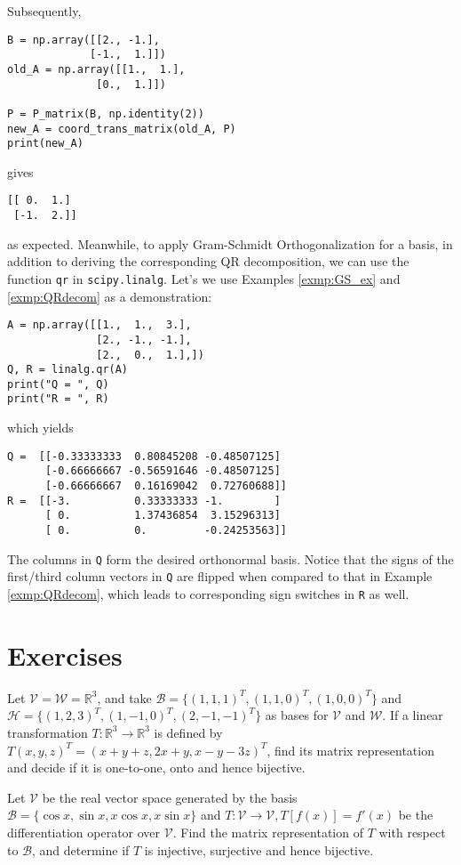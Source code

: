 Subsequently,
\begin{lstlisting}
B = np.array([[2., -1.], 
             [-1.,  1.]])
old_A = np.array([[1.,  1.], 
              [0.,  1.]])

P = P_matrix(B, np.identity(2))
new_A = coord_trans_matrix(old_A, P)
print(new_A)    
\end{lstlisting}
gives
\begin{lstlisting}
[[ 0.  1.]
 [-1.  2.]]    
\end{lstlisting}
as expected. Meanwhile, to apply Gram-Schmidt Orthogonalization for a basis, in addition to deriving the corresponding QR decomposition, we can use the function \verb|qr| in \verb|scipy.linalg|. Let's we use Examples \ref{exmp:GS_ex} and \ref{exmp:QRdecom} as a demonstration:
\begin{lstlisting}
A = np.array([[1.,  1.,  3.],
              [2., -1., -1.],
              [2.,  0.,  1.],])
Q, R = linalg.qr(A)
print("Q = ", Q)
print("R = ", R)
\end{lstlisting}
which yields
\begin{lstlisting}
Q =  [[-0.33333333  0.80845208 -0.48507125]
      [-0.66666667 -0.56591646 -0.48507125]
      [-0.66666667  0.16169042  0.72760688]]
R =  [[-3.          0.33333333 -1.        ]
      [ 0.          1.37436854  3.15296313]
      [ 0.          0.         -0.24253563]]
\end{lstlisting}
The columns in \verb|Q| form the desired orthonormal basis. Notice that the signs of the first/third column vectors in \verb|Q| are flipped when compared to that in Example \ref{exmp:QRdecom}, which leads to corresponding sign switches in \verb|R| as well.

\section{Exercises}

\begin{Exercise}
Let $\mathcal{V} = \mathcal{W} = \mathbb{R}^3$, and take $\mathcal{B} = \{(1,1,1)^T, (1,1,0)^T, (1,0,0)^T\}$ and $\mathcal{H} = \{(1,2,3)^T, (1,-1,0)^T, (2,-1,-1)^T\}$ as bases for $\mathcal{V}$ and $\mathcal{W}$. If a linear transformation $T: \mathbb{R}^3 \to \mathbb{R}^3$ is defined by $T(x,y,z)^T = (x+y+z,2x+y,x-y-3z)^T$, find its matrix representation and decide if it is one-to-one, onto and hence bijective.
\end{Exercise}

\begin{Exercise}
Let $\mathcal{V}$ be the real vector space generated by the basis $\mathcal{B} = \{\cos x, \sin x, x\cos x, x\sin x\}$ and $T: \mathcal{V} \to \mathcal{V}, T[f(x)] = f'(x)$ be the differentiation operator over $\mathcal{V}$. Find the matrix representation of $T$ with respect to $\mathcal{B}$, and determine if $T$ is injective, surjective and hence bijective. 
\end{Exercise}

